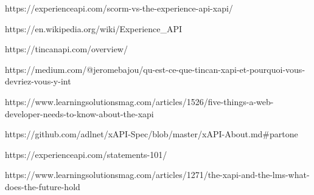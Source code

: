 

https://experienceapi.com/scorm-vs-the-experience-api-xapi/

https://en.wikipedia.org/wiki/Experience_API

https://tincanapi.com/overview/

https://medium.com/@jeromebajou/qu-est-ce-que-tincan-xapi-et-pourquoi-vous-devriez-vous-y-int%

https://www.learningsolutionsmag.com/articles/1526/five-things-a-web-developer-needs-to-know-about-the-xapi

https://github.com/adlnet/xAPI-Spec/blob/master/xAPI-About.md#partone

https://experienceapi.com/statements-101/

https://www.learningsolutionsmag.com/articles/1271/the-xapi-and-the-lms-what-does-the-future-hold


